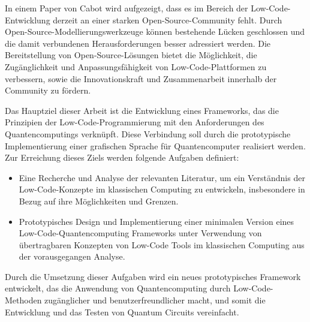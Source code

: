 In einem Paper von Cabot\cite{Cabot_2020} wird aufgezeigt, dass es im Bereich der Low-Code-Entwicklung derzeit an einer 
starken Open-Source-Community fehlt. Durch Open-Source-Modellierungswerkzeuge können 
bestehende Lücken geschlossen und die damit verbundenen Herausforderungen 
besser adressiert werden. Die Bereitstellung von Open-Source-Lösungen bietet die Möglichkeit, die Zugänglichkeit und 
Anpassungsfähigkeit von Low-Code-Plattformen zu verbessern, sowie die Innovationskraft und Zusammenarbeit innerhalb der Community zu fördern.

Das Hauptziel dieser Arbeit ist die Entwicklung eines Frameworks, das
die Prinzipien der Low-Code-Programmierung mit den Anforderungen des
Quantencomputings verknüpft. Diese Verbindung soll durch die
prototypische Implementierung einer grafischen Sprache für
Quantencomputer realisiert werden. Zur Erreichung dieses Ziels werden
folgende Aufgaben definiert:

\begin{itemize}
\item
  Eine Recherche und Analyse der relevanten Literatur, um ein
  Verständnis der Low-Code-Konzepte im klassischen Computing zu
  entwickeln, insbesondere in Bezug auf ihre Möglichkeiten und Grenzen.
\item
  Prototypisches Design und Implementierung einer minimalen Version
  eines Low-Code-Quantencomputing Frameworks unter Verwendung von
  übertragbaren Konzepten von Low-Code Tools im klassischen Computing
  aus der vorausgegangen Analyse.
\end{itemize}

Durch die Umsetzung dieser Aufgaben wird ein neues prototypisches
Framework entwickelt, das die Anwendung von Quantencomputing durch
Low-Code-Methoden zugänglicher und benutzerfreundlicher macht, und somit
die Entwicklung und das Testen von Quantum Circuits vereinfacht.




